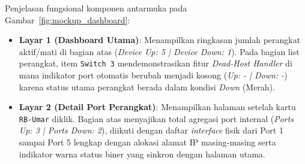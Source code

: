 \documentclass[12pt,titlepage]{article}
\begin{document}
Penjelasan fungsional komponen antarmuka pada Gambar~\ref{fig:mockup_dashboard}:
\begin{itemize}
    \item \textbf{Layar 1 (Dashboard Utama)}: Menampilkan ringkasan jumlah perangkat aktif/mati di bagian atas (\textit{Device Up: 5 | Device Down: 1}). Pada bagian list perangkat, item \texttt{Switch 3} mendemonstrasikan fitur \textit{Dead-Host Handler} di mana indikator port otomatis berubah menjadi kosong (\textit{Up: - | Down: -}) karena status utama perangkat berada dalam kondisi \textit{Down} (Merah).
    \item \textbf{Layar 2 (Detail Port Perangkat)}: Menampilkan halaman setelah kartu \texttt{RB-Umar} diklik. Bagian atas menyajikan total agregasi port internal (\textit{Ports Up: 3 | Ports Down: 2}), diikuti dengan daftar \textit{interface} fisik dari Port 1 sampai Port 5 lengkap dengan alokasi alamat IP masing-masing serta indikator warna status biner yang sinkron dengan halaman utama.
\end{itemize}
\end{document}
